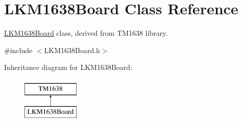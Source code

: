 \hypertarget{class_l_k_m1638_board}{}\section{L\+K\+M1638\+Board Class Reference}
\label{class_l_k_m1638_board}


\hyperlink{class_l_k_m1638_board}{L\+K\+M1638\+Board} class, derived from T\+M1638 library.  




{\ttfamily \#include $<$L\+K\+M1638\+Board.\+h$>$}

Inheritance diagram for L\+K\+M1638\+Board\+:\begin{figure}[H]
\begin{center}
\leavevmode
\includegraphics[height=2.000000cm]{class_l_k_m1638_board}
\end{center}
\end{figure}
